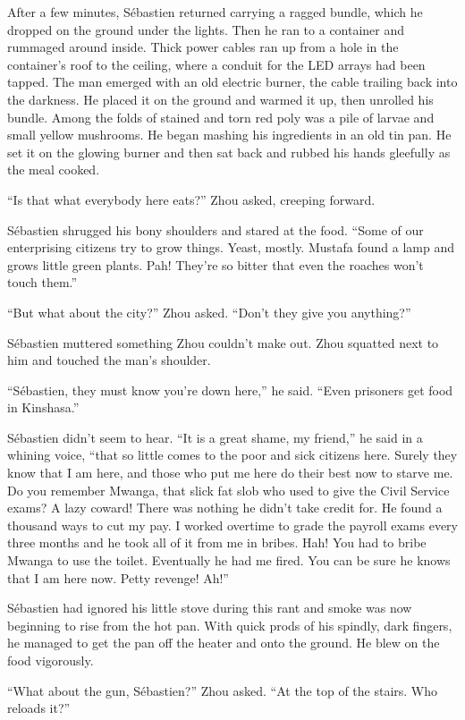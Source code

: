 \documentclass[10pt,b5paper]{article}
\begin{document}
After a few minutes, S\'{e}bastien returned carrying a ragged bundle,
which he dropped on the ground under the lights. Then he ran to a
container and rummaged around inside. Thick power cables ran up from
a hole in the container's roof to the ceiling, where a conduit for
the LED arrays had been tapped. The man emerged with an old electric
burner, the cable trailing back into the darkness. He placed it
on the ground and warmed it up, then unrolled his bundle. Among
the folds of stained and torn red poly was a pile of larvae and
small yellow mushrooms. He began mashing his ingredients in an
old tin pan. He set it on the glowing burner and then sat back
and rubbed his hands gleefully as the meal cooked.

``Is that what everybody here eats?'' Zhou asked, creeping forward.

S\'{e}bastien shrugged his bony shoulders and stared at
the food. ``Some of our enterprising citizens try to grow
things. Yeast, mostly. Mustafa found a lamp and grows little green
plants. Pah! They're so bitter that even the roaches won't touch
them.''

``But what about the city?'' Zhou asked. ``Don't they give you
anything?''

S\'{e}bastien muttered something Zhou couldn't make out. Zhou squatted
next to him and touched the man's shoulder.

``S\'{e}bastien, they must know you're down here,'' he said. ``Even
prisoners get food in Kinshasa.''

S\'{e}bastien didn't seem to hear. ``It is a great shame, my friend,''
he said in a whining voice, ``that so little comes to the poor and
sick citizens here. Surely they know that I am here, and those
who put me here do their best now to starve me. Do you remember
Mwanga, that slick fat slob who used to give the Civil Service
exams? A lazy coward! There was nothing he didn't take credit
for. He found a thousand ways to cut my pay. I worked overtime
to grade the payroll exams every three months and he took all of
it from me in bribes. Hah! You had to bribe Mwanga to use the
toilet. Eventually he had me fired. You can be sure he knows that
I am here now. Petty revenge! Ah!''

S\'{e}bastien had ignored his little stove during this rant and smoke
was now beginning to rise from the hot pan. With quick prods of
his spindly, dark fingers, he managed to get the pan off the heater
and onto the ground. He blew on the food vigorously.

``What about the gun, S\'{e}bastien?'' Zhou asked. ``At the top of the
stairs. Who reloads it?''
\end{document}
